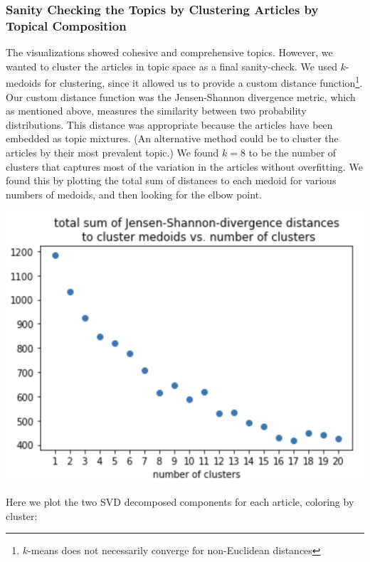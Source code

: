 \documentclass[11pt]{article}
\begin{document}
\subsubsection{Sanity Checking the Topics by Clustering Articles by Topical Composition}
The visualizations showed cohesive and comprehensive topics. However, we wanted to cluster
the articles in topic space as a final sanity-check.  We used $k$-medoids for clustering,
since it allowed us to provide a custom distance function\footnote{$k$-means does not 
necessarily converge for non-Euclidean distances}.
Our custom distance function was the Jensen-Shannon divergence metric, which as mentioned above,
measures the similarity between two probability distributions.
This distance was appropriate because the articles have been embedded as topic mixtures. 
(An alternative method could be to cluster the articles by their most prevalent topic.) 
We found $k=8$ to be the number of clusters that captures most of the variation in the
articles without overfitting. We found this by plotting the total sum of distances to each
medoid for various numbers of medoids, and then looking for the elbow point.

\begin{center}
 \includegraphics[scale=0.6]{jensen.png}
\end{center}

Here we plot the two SVD decomposed components for each article, coloring by cluster:
\end{document}
